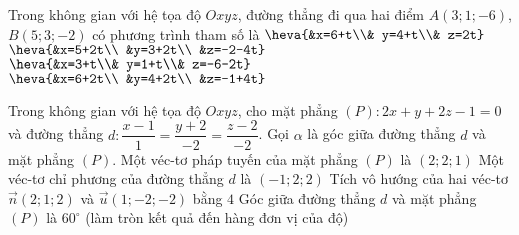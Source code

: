 \begin{ex}%
	Trong không gian với hệ tọa độ $Oxyz$, đường thẳng đi qua hai điểm $A(3;1;-6)$, $B(5;3;-2)$ có phương trình tham số là
	\choice
	{\True$ \heva{&x=6+t\\& y=4+t\\& z=2t} $}
	{$ \heva{&x=5+2t\\ &y=3+2t\\ &z=-2-4t} $}
	{ $ \heva{&x=3+t\\& y=1+t\\& z=-6-2t} $}
	{$ \heva{&x=6+2t\\ &y=4+2t\\ &z=-1+4t} $}
\end{ex}

\begin{ex}%
	Trong không gian với hệ tọa độ $Oxyz$, cho mặt phẳng $(P)\colon 2x+y+2z-1=0$ và đường thẳng $d\colon\dfrac{x-1}{1}=\dfrac{y+2}{-2}=\dfrac{z-2}{-2}$. Gọi $\alpha$ là góc giữa đường thẳng $d$ và mặt phẳng $(P)$.
	\choiceTFt
	{Một véc-tơ pháp tuyến của mặt phẳng $(P)$ là $(2;2;1)$}
	{\True Một véc-tơ chỉ phương của đường thẳng $d$ là $(-1;2;2)$}
	{Tích vô hướng của hai véc-tơ $\overrightarrow{n}(2;1;2)$ và $\overrightarrow{u}(1;-2;-2)$ bằng $4$}
	{Góc giữa đường thẳng $d$ và mặt phẳng $(P)$ là $60^\circ$ (làm tròn kết quả đến hàng đơn vị của độ)}
\end{ex}

